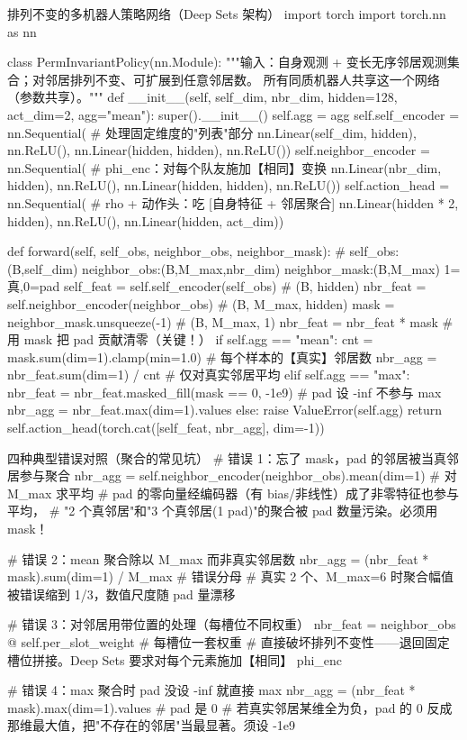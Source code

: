 \begin{codebox}[Python]{排列不变的多机器人策略网络（Deep Sets 架构）}
import torch
import torch.nn as nn

class PermInvariantPolicy(nn.Module):
    """输入：自身观测 + 变长无序邻居观测集合；对邻居排列不变、可扩展到任意邻居数。
    所有同质机器人共享这一个网络（参数共享）。"""
    def __init__(self, self_dim, nbr_dim, hidden=128, act_dim=2, agg="mean"):
        super().__init__()
        self.agg = agg
        self.self_encoder = nn.Sequential(             # 处理固定维度的"列表"部分
            nn.Linear(self_dim, hidden), nn.ReLU(),
            nn.Linear(hidden, hidden), nn.ReLU())
        self.neighbor_encoder = nn.Sequential(         # phi_enc：对每个队友施加【相同】变换
            nn.Linear(nbr_dim, hidden), nn.ReLU(),
            nn.Linear(hidden, hidden), nn.ReLU())
        self.action_head = nn.Sequential(              # rho + 动作头：吃 [自身特征 + 邻居聚合]
            nn.Linear(hidden * 2, hidden), nn.ReLU(),
            nn.Linear(hidden, act_dim))

    def forward(self, self_obs, neighbor_obs, neighbor_mask):
        # self_obs:(B,self_dim)  neighbor_obs:(B,M_max,nbr_dim)  neighbor_mask:(B,M_max) 1=真,0=pad
        self_feat = self.self_encoder(self_obs)              # (B, hidden)
        nbr_feat  = self.neighbor_encoder(neighbor_obs)      # (B, M_max, hidden)
        mask = neighbor_mask.unsqueeze(-1)                   # (B, M_max, 1)
        nbr_feat = nbr_feat * mask                           # 用 mask 把 pad 贡献清零（关键！）
        if self.agg == "mean":
            cnt = mask.sum(dim=1).clamp(min=1.0)             # 每个样本的【真实】邻居数
            nbr_agg = nbr_feat.sum(dim=1) / cnt              # 仅对真实邻居平均
        elif self.agg == "max":
            nbr_feat = nbr_feat.masked_fill(mask == 0, -1e9) # pad 设 -inf 不参与 max
            nbr_agg = nbr_feat.max(dim=1).values
        else:
            raise ValueError(self.agg)
        return self.action_head(torch.cat([self_feat, nbr_agg], dim=-1))
\end{codebox}

\begin{codebox}[Python]{四种典型错误对照（聚合的常见坑）}
# 错误 1：忘了 mask，pad 的邻居被当真邻居参与聚合
nbr_agg = self.neighbor_encoder(neighbor_obs).mean(dim=1)   # 对 M_max 求平均
#   pad 的零向量经编码器（有 bias/非线性）成了非零特征也参与平均，
#   "2 个真邻居"和"3 个真邻居(1 pad)"的聚合被 pad 数量污染。必须用 mask！

# 错误 2：mean 聚合除以 M_max 而非真实邻居数
nbr_agg = (nbr_feat * mask).sum(dim=1) / M_max             # 错误分母
#   真实 2 个、M_max=6 时聚合幅值被错误缩到 1/3，数值尺度随 pad 量漂移

# 错误 3：对邻居用带位置的处理（每槽位不同权重）
nbr_feat = neighbor_obs @ self.per_slot_weight             # 每槽位一套权重
#   直接破坏排列不变性——退回固定槽位拼接。Deep Sets 要求对每个元素施加【相同】 phi_enc

# 错误 4：max 聚合时 pad 没设 -inf 就直接 max
nbr_agg = (nbr_feat * mask).max(dim=1).values              # pad 是 0
#   若真实邻居某维全为负，pad 的 0 反成那维最大值，把"不存在的邻居"当最显著。须设 -1e9
\end{codebox}

